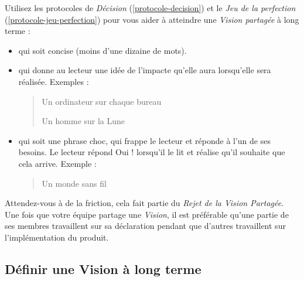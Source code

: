 \documentclass[paper=6in:9in,pagesize=pdftex,headinclude=on,footinclude=on,11pt]{scrbook}
\newcommand*{\numref}[1]{{\hyperref[{#1}]{\autoref*{#1}}}}
\begin{document}
Utilisez les protocoles de \emph{Décision} (\numref{protocole-decision}) et le \emph{Jeu de la perfection} (\numref{protocole-jeu-perfection})
pour vous aider à atteindre une \emph{Vision partagée} à long terme :
\begin{itemize}
	\item qui soit concise (moins d'une dizaine de mots).
	\item qui donne au lecteur une idée de l'impacte qu'elle aura lorsqu'elle sera réalisée. Exemples :
		  \begin{quote}
		  	\og{}Un ordinateur sur chaque bureau\fg{}

		  	\og{}Un homme sur la Lune\fg{}
		  \end{quote}
	\item qui soit une phrase \og{}choc\fg{}, qui frappe le lecteur et réponde à l'un de ses besoins. Le lecteur répond \og{}Oui !\fg{}
	      lorsqu'il le lit et réalise qu'il souhaite que cela arrive. Exemple :
	      \begin{quote}
	      	\og{}Un monde sans fil\fg{}
	      \end{quote}
\end{itemize}

Attendez-vous à de la friction, cela fait partie du \emph{Rejet de la Vision Partagée}. Une fois que votre équipe partage une
\emph{Vision}, il est préférable qu'une partie de ses membres travaillent sur sa déclaration pendant que d'autres travaillent sur
l'implémentation du produit.

\subsection{Définir une Vision à long terme}
\end{document}
